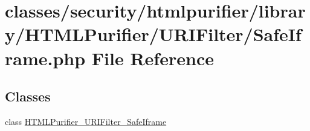 \hypertarget{SafeIframe_8php}{\section{classes/security/htmlpurifier/library/\+H\+T\+M\+L\+Purifier/\+U\+R\+I\+Filter/\+Safe\+Iframe.php File Reference}
\label{SafeIframe_8php}
}
\subsection*{Classes}
\begin{DoxyCompactItemize}
\item 
class \hyperlink{classHTMLPurifier__URIFilter__SafeIframe}{H\+T\+M\+L\+Purifier\+\_\+\+U\+R\+I\+Filter\+\_\+\+Safe\+Iframe}
\end{DoxyCompactItemize}
